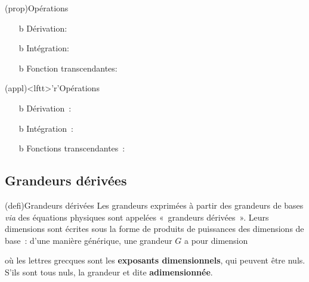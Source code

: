 \documentclass[../../main/main.tex]{subfiles}
\begin{document}
\begin{tcbraster}[raster equal height=rows]
	\begin{tcb*}(prop){Opérations}
		\begin{enumerate}
			\item[b]{Dérivation}: 
			\item[b]{Intégration}: 
			\item[b]{Fonction transcendantes}: 
		\end{enumerate}
	\end{tcb*}
	\begin{tcb}(appl)<lftt>'r'{Opérations}
		\begin{enumerate}
			\item[b]{Dérivation}~:
			\psw{
				\[
					v_z =
					\dv{z}{t} \Ra \dim{v_z} =
					\frac{\dim{z}}{\dim{t}} =
					\rm L \cdot T^{-1}
				\]
			}
			\vspace*{-15pt}
			\item[b]{Intégration}~:
			\psw{
				\[
					\Ec = \int_{t_1}^{t_2} \Pc(t)\dd{t} \Ra \dim{\Ec} = \dim{\Pc} \times \dim{t}
				\]
			}
			\vspace*{-15pt}
			\item[b]{Fonctions transcendantes}~:
			\psw{
				\[
					[\exp(-t/\tau)] = 1 \Lra \dim{\tau} = \dim{t}
				\]
			}
			\vspace*{-15pt}
		\end{enumerate}
	\end{tcb}
\end{tcbraster}

\vspace{-10pt}
\subsection{Grandeurs dérivées}

\begin{tcb*}(defi){Grandeurs dérivées}
	Les grandeurs exprimées à partir des grandeurs de bases \textit{via} des
	équations physiques sont appelées «~grandeurs dérivées~». Leurs dimensions sont
	écrites sous la forme de produits de puissances des dimensions de base~: d'une
	manière générique, une grandeur $G$ a pour dimension

	\psw{
		\[
			\boxed{\dim{G} = \rm L^\alpha M^\beta T^\gamma I^\delta \Theta^\epsilon N^\xi
				J^\eta}
		\]
	}
	où les lettres grecques sont les \textbf{exposants dimensionnels}, qui peuvent
	être nuls. S'ils sont tous nuls, la grandeur et dite \textbf{adimensionnée}.
\end{tcb*}
\end{document}
